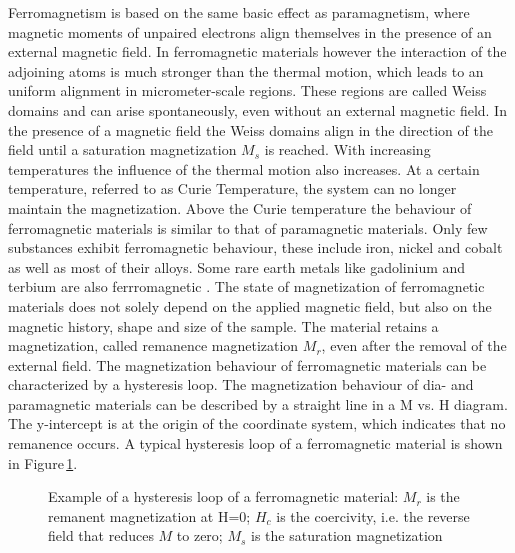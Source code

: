 Ferromagnetism is based on the same basic effect as paramagnetism, where magnetic moments of unpaired electrons align themselves in the presence of an external magnetic field. In ferromagnetic materials however the interaction of the adjoining atoms is much stronger than the thermal motion, which leads to an uniform alignment in micrometer-scale regions. These regions are called Weiss domains and can arise spontaneously, even without an external magnetic field. In the presence of a magnetic field the Weiss domains align in the direction of the field until a saturation magnetization $M_{s}$ is reached. With increasing temperatures the influence of the thermal motion also increases. At a certain temperature, referred to as Curie Temperature, the system can no longer maintain the magnetization. Above the Curie temperature the behaviour of ferromagnetic materials is similar to that of paramagnetic materials. Only few substances exhibit ferromagnetic behaviour, these include iron, nickel and cobalt as well as most of their alloys. Some rare earth metals like gadolinium and terbium are also ferrromagnetic \cite{svoboda2004magnetic}. The state of magnetization of ferromagnetic materials does not solely depend on the applied magnetic field, but also on the magnetic history, shape and size of the sample. The material retains a magnetization, called remanence magnetization $M_{r}$, even after the removal of the external field. The magnetization behaviour of ferromagnetic materials can be characterized by a hysteresis loop. The magnetization behaviour of dia- and paramagnetic materials can be described by a straight line in a M vs. H diagram. The y-intercept is at the origin of the coordinate system, which indicates that no remanence occurs. A typical hysteresis loop of a ferromagnetic material is shown in Figure\,\ref{fig:hyst_loop}. 

\begin{figure}[h]
\centering

\caption[Hysteresis loop of a ferromagnetic material]{Example of a hysteresis loop of a ferromagnetic material: $M_{r}$ is the remanent magnetization at H=0; ${H}_{c}$ is the coercivity, i.e. the reverse field that reduces $M$ to zero; $M_{s}$ is the saturation magnetization
\label{fig:hyst_loop}
}
\end{figure}

